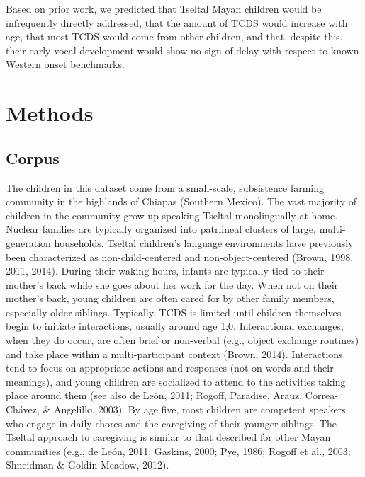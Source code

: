 \documentclass[floatsintext,man]{apa6}
\theoremstyle{definition}
\theoremstyle{definition}
\theoremstyle{definition}
\theoremstyle{remark}
\begin{document}
Based on prior work, we predicted that Tseltal Mayan children would be
infrequently directly addressed, that the amount of TCDS would increase
with age, that most TCDS would come from other children, and that,
despite this, their early vocal development would show no sign of delay
with respect to known Western onset benchmarks.

\hypertarget{methods}{\section{Methods}\label{methods}}

\subsection{Corpus}\label{methods-dataset}

The children in this dataset come from a small-scale, subsistence
farming community in the highlands of Chiapas (Southern Mexico). The
vast majority of children in the community grow up speaking Tseltal
monolingually at home. Nuclear families are typically organized into
patrlineal clusters of large, multi-generation households. Tseltal
children's language environments have previously been characterized as
non-child-centered and non-object-centered (Brown, 1998, 2011, 2014).
During their waking hours, infants are typically tied to their mother's
back while she goes about her work for the day. When not on their
mother's back, young children are often cared for by other family
members, especially older siblings. Typically, TCDS is limited until
children themselves begin to initiate interactions, usually around age
1;0. Interactional exchanges, when they do occur, are often brief or
non-verbal (e.g., object exchange routines) and take place within a
multi-participant context (Brown, 2014). Interactions tend to focus on
appropriate actions and responses (not on words and their meanings), and
young children are socialized to attend to the activities taking place
around them (see also de León, 2011; Rogoff, Paradise, Arauz,
Correa-Chávez, \& Angelillo, 2003). By age five, most children are
competent speakers who engage in daily chores and the caregiving of
their younger siblings. The Tseltal approach to caregiving is similar to
that described for other Mayan communities (e.g., de León, 2011;
Gaskins, 2000; Pye, 1986; Rogoff et al., 2003; Shneidman \&
Goldin-Meadow, 2012).
\end{document}

